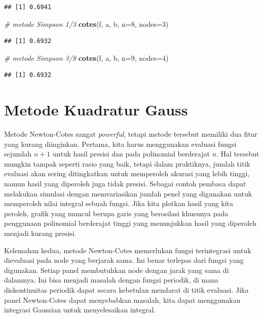 \documentclass[]{book}
\newenvironment{Shaded}{\begin{snugshade}}{\end{snugshade}}
\newcommand{\CommentTok}[1]{\textcolor[rgb]{0.56,0.35,0.01}{\textit{#1}}}
\newcommand{\DataTypeTok}[1]{\textcolor[rgb]{0.13,0.29,0.53}{#1}}
\newcommand{\DecValTok}[1]{\textcolor[rgb]{0.00,0.00,0.81}{#1}}
\newcommand{\KeywordTok}[1]{\textcolor[rgb]{0.13,0.29,0.53}{\textbf{#1}}}
\newcommand{\NormalTok}[1]{#1}
\theoremstyle{definition}
\theoremstyle{definition}
\theoremstyle{definition}
\theoremstyle{remark}
\begin{document}
\begin{verbatim}
## [1] 0.6941
\end{verbatim}

\begin{Shaded}
\begin{Highlighting}[]
\CommentTok{# metode Simpson 1/3}
\KeywordTok{cotes}\NormalTok{(f, a, b, }\DataTypeTok{n=}\DecValTok{8}\NormalTok{, }\DataTypeTok{nodes=}\DecValTok{3}\NormalTok{)}
\end{Highlighting}
\end{Shaded}

\begin{verbatim}
## [1] 0.6932
\end{verbatim}

\begin{Shaded}
\begin{Highlighting}[]
\CommentTok{# metode Simpson 3/8}
\KeywordTok{cotes}\NormalTok{(f, a, b, }\DataTypeTok{n=}\DecValTok{9}\NormalTok{, }\DataTypeTok{nodes=}\DecValTok{4}\NormalTok{)}
\end{Highlighting}
\end{Shaded}

\begin{verbatim}
## [1] 0.6932
\end{verbatim}

\hypertarget{kuadgauss}{%
\section{Metode Kuadratur Gauss}\label{kuadgauss}}

Metode Newton-Cotes sangat \emph{powerful}, tetapi metode tersebut memiliki dua fitur yang kurang diinginkan. Pertama, kita harus menggunakan evaluasi fungsi sejumlah \(n +1\) untuk hasil presisi dan pada polinomial berderajat \(n\). Hal tersebut mungkin tampak seperti rasio yang baik, tetapi dalam praktiknya, jumlah titik evaluasi akan sering ditingkatkan untuk memperoleh akurasi yang lebih tinggi, namun hasil yang diperoleh juga tidak presisi. Sebagai contoh pembaca dapat melakukan simulasi dengan memvariasikan jumlah penel yang digunakan untuk memperoleh nilai integral sebuah fungsi. Jika kita plotkan hasil yang kita peroleh, grafik yang muncul berupa garis yang berosilasi khusunya pada penggunaan polinomial berderajat tinggi yang menunjukkan hasil yang diperoleh menjadi kurang presisi.

Kelemahan kedua, metode Newton-Cotes memerlukan fungsi terintegrasi untuk dievaluasi pada node yang berjarak sama. Ini benar terlepas dari fungsi yang digunakan. Setiap panel membutuhkan node dengan jarak yang sama di dalamnya. Ini bisa menjadi masalah dengan fungsi periodik, di mana diskontinuitas periodik dapat secara kebetulan mendarat di titik evaluasi. Jika panel Newton-Cotes dapat menyebabkan masalah, kita dapat menggunakan integrasi Gaussian untuk menyelesaikan integral.
\end{document}
